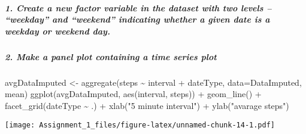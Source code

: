 \documentclass[
]{article}
\newenvironment{Shaded}{\begin{snugshade}}{\end{snugshade}}
\newcommand{\AttributeTok}[1]{\textcolor[rgb]{0.77,0.63,0.00}{#1}}
\newcommand{\DecValTok}[1]{\textcolor[rgb]{0.00,0.00,0.81}{#1}}
\newcommand{\FunctionTok}[1]{\textcolor[rgb]{0.00,0.00,0.00}{#1}}
\newcommand{\NormalTok}[1]{#1}
\newcommand{\OtherTok}[1]{\textcolor[rgb]{0.56,0.35,0.01}{#1}}
\newcommand{\SpecialCharTok}[1]{\textcolor[rgb]{0.00,0.00,0.00}{#1}}
\newcommand{\StringTok}[1]{\textcolor[rgb]{0.31,0.60,0.02}{#1}}
\begin{document}
\hypertarget{create-a-new-factor-variable-in-the-dataset-with-two-levels-weekday-and-weekend-indicating-whether-a-given-date-is-a-weekday-or-weekend-day.}{%
\subparagraph{1. Create a new factor variable in the dataset with two
levels -- ``weekday'' and ``weekend'' indicating whether a given date is
a weekday or weekend
day.}\label{create-a-new-factor-variable-in-the-dataset-with-two-levels-weekday-and-weekend-indicating-whether-a-given-date-is-a-weekday-or-weekend-day.}}

\begin{Shaded}
\end{Shaded}

\hypertarget{make-a-panel-plot-containing-a-time-series-plot}{%
\subparagraph{2. Make a panel plot containing a time series
plot}\label{make-a-panel-plot-containing-a-time-series-plot}}

\begin{Shaded}
\begin{Highlighting}[]
\NormalTok{avgDataImputed }\OtherTok{\textless{}{-}} \FunctionTok{aggregate}\NormalTok{(steps }\SpecialCharTok{\textasciitilde{}}\NormalTok{ interval }\SpecialCharTok{+}\NormalTok{ dateType, }\AttributeTok{data=}\NormalTok{DataImputed, mean)}
\FunctionTok{ggplot}\NormalTok{(avgDataImputed, }\FunctionTok{aes}\NormalTok{(interval, steps)) }\SpecialCharTok{+} 
    \FunctionTok{geom\_line}\NormalTok{() }\SpecialCharTok{+} 
    \FunctionTok{facet\_grid}\NormalTok{(dateType }\SpecialCharTok{\textasciitilde{}}\NormalTok{ .) }\SpecialCharTok{+}
    \FunctionTok{xlab}\NormalTok{(}\StringTok{"5 minute interval"}\NormalTok{) }\SpecialCharTok{+} 
    \FunctionTok{ylab}\NormalTok{(}\StringTok{"avarage steps"}\NormalTok{)}
\end{Highlighting}
\end{Shaded}

\texttt{[image: Assignment\_1\_files/figure-latex/unnamed-chunk-14-1.pdf]}
\end{document}
